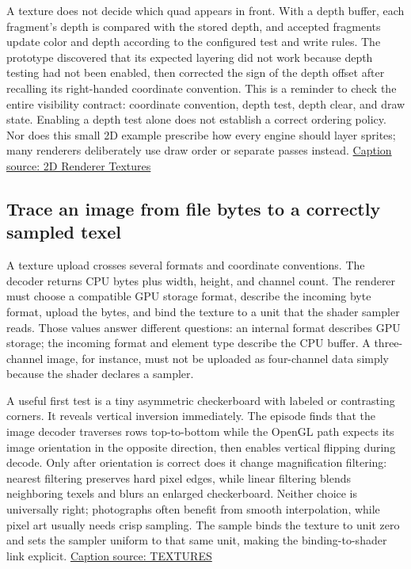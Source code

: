 A texture does not decide which quad appears in front. With a depth buffer, each fragment's depth is compared with the stored depth, and accepted fragments update color and depth according to the configured test and write rules. The prototype discovered that its expected layering did not work because depth testing had not been enabled, then corrected the sign of the depth offset after recalling its right-handed coordinate convention. This is a reminder to check the entire visibility contract: coordinate convention, depth test, depth clear, and draw state. Enabling a depth test alone does not establish a correct ordering policy. Nor does this small 2D example prescribe how every engine should layer sprites; many renderers deliberately use draw order or separate passes instead. \href{https://www.youtube.com/watch?v=mW8eW3pLtmk}{Caption source: 2D Renderer Textures}

\subsection{Trace an image from file bytes to a correctly sampled texel}\label{06-engine-ii-ch027-trace-an-image-from-file-bytes-to-a-correctly-sampled-texel}

\hypertarget{06-engine-ii-ch027-trace-an-image-from-file-bytes-to-a-correctly-sampled-texel}{}

A texture upload crosses several formats and coordinate conventions. The decoder returns CPU bytes plus width, height, and channel count. The renderer must choose a compatible GPU storage format, describe the incoming byte format, upload the bytes, and bind the texture to a unit that the shader sampler reads. Those values answer different questions: an internal format describes GPU storage; the incoming format and element type describe the CPU buffer. A three-channel image, for instance, must not be uploaded as four-channel data simply because the shader declares a sampler.

A useful first test is a tiny asymmetric checkerboard with labeled or contrasting corners. It reveals vertical inversion immediately. The episode finds that the image decoder traverses rows top-to-bottom while the OpenGL path expects its image orientation in the opposite direction, then enables vertical flipping during decode. Only after orientation is correct does it change magnification filtering: nearest filtering preserves hard pixel edges, while linear filtering blends neighboring texels and blurs an enlarged checkerboard. Neither choice is universally right; photographs often benefit from smooth interpolation, while pixel art usually needs crisp sampling. The sample binds the texture to unit zero and sets the sampler uniform to that same unit, making the binding-to-shader link explicit. \href{https://www.youtube.com/watch?v=qEfohFgQ1-I}{Caption source: TEXTURES}

